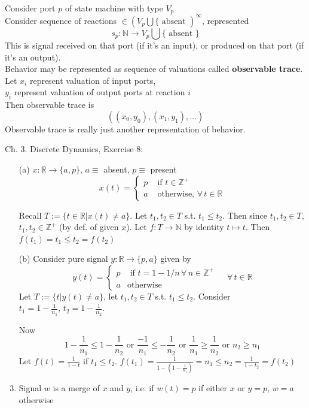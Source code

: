 \documentclass[10pt]{amsart}
\newcommand{\exercisehead}[1]
  { \smallskip
   \noindent{\small\bf Exercise #1.}
  }
\begin{document}
Consider port $p$ of state machine with type $V_p$ \\
Consider sequence of reactions $\in (V_p \bigcup \lbrace \text{ absent })^{\infty}$, represented
\[
s_p : \mathbb{N} \to V_p \bigcup \lbrace \text{ absent } \rbrace 
\]
This is signal received on that port (if it's an input), or produced on that port (if it's an output). \\
Behavior may be represented as sequence of valuations called \textbf{observable trace}. \\
Let $x_i$ represent valuation of input ports, \\
$y_i$ represent valuation of output ports at reaction $i$\\
Then observable trace is 
\[
((x_0,y_0), (x_1, y_1), \dots)
\]
Observable trace is really just another representation of behavior.

Ch. 3. Discrete Dynamics, Exercise 8:

\exercisehead{8} \begin{enumerate}
	\item[(a)] $x: \mathbb{R} \to \lbrace a, p \rbrace$, $a \equiv $ absent, $p \equiv$ present 
	\[
	x(t) = \begin{cases} p & \text{ if } t \in \mathbb{Z}^+ \\ 
	a & \text{ otherwise, } \forall \, t\in \mathbb{R} \end{cases}
	\]
	
	Recall $T:= \lbrace t\in \mathbb{R} | x(t) \neq a \rbrace$. Let $t_1, t_2 \in T$ s.t. $t_1 \leq t_2$. Then since $t_1, t_2 \in T$, $t_1, t_2 \in \mathbb{Z}^+$ (by def. of given $x$). Let $f:T \to \mathbb{N}$ by identity $t \mapsto t$. Then $f(t_1) = t_1 \leq t_2 = f(t_2)$
 	\item[(b)]  Consider pure signal $y : \mathbb{R} \to \lbrace p, a \rbrace$ given by 
 	\[
 	y(t) = \begin{cases} p  & \text{ if } t = 1 -1/n \, \forall \, n \in \mathbb{Z}^+ \\ 
 	a & \text{otherwise } \end{cases} \quad \, \forall \, t \in \mathbb{R} 
  	\]
  	Let $T := \lbrace t | y(t) \neq a \rbrace$, let $t_1, t_2 \in T$ s.t. $t_1 \leq t_2$. Consider $t_1 = 1 - \frac{1}{n_1}, \, t_2 =  1 - \frac{1}{n_2}$. 
  	
  	Now
  	\[
  		1 - \frac{1}{n_1} \leq 1 - \frac{1}{n_2} \text{ or } \frac{-1}{n_1} \leq -\frac{1}{n_2} \text{ or } \frac{1}{n_1} \geq \frac{1}{n_2} \text{ or } n_2 \geq n_1
  	\]
  	Let $f(t) = \frac{1}{1-t}$ if $t_1 \leq t_2$.  $f(t_1) = \frac{1}{ 1 - \left( 1 - \frac{1}{n_1} \right) } = n_1 \leq n_2  = \frac{1}{ 1 - t_2 } = f(t_2)$
	\item Signal $w$ is a merge of $x$ and $y$, i.e. if $w(t) = p$ if either $x$ or $y = p$, $w=a$ otherwise
\end{enumerate}
\end{document}
